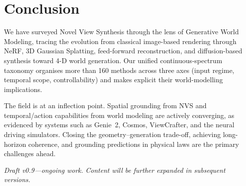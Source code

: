 \section{Conclusion}
\label{sec:conclusion}

We have surveyed Novel View Synthesis through the lens of Generative World Modeling,
tracing the evolution from classical image-based rendering through NeRF,
3D Gaussian Splatting, feed-forward reconstruction, and diffusion-based synthesis
toward 4-D world generation.
Our unified continuous-spectrum taxonomy organises more than 160 methods across
three axes (input regime, temporal scope, controllability) and makes explicit
their world-modelling implications.

The field is at an inflection point.
Spatial grounding from NVS and temporal/action capabilities from world modeling
are actively converging, as evidenced by systems such as Genie~2, Cosmos,
ViewCrafter, and the neural driving simulators.
Closing the geometry--generation trade-off, achieving long-horizon coherence,
and grounding predictions in physical laws are the primary challenges ahead.

\medskip
\noindent\textit{Draft v0.9---ongoing work.
Content will be further expanded in subsequent versions.}

